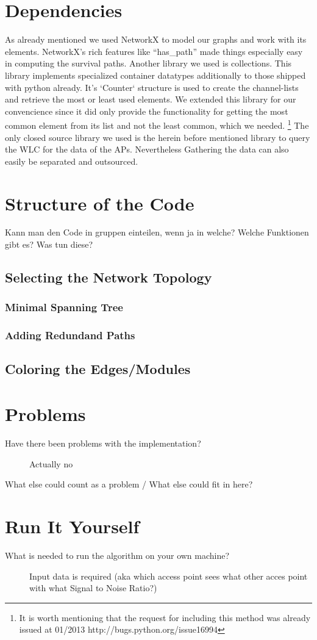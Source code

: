 \section{Dependencies}
  As already mentioned we used NetworkX\cite{hagberg-2008-exploring} to model our graphs and work with its elements.
  NetworkX's rich features like ``has\_path'' made things especially easy in computing the survival paths.
  Another library we used is collections. \cite{python_collections}
  This library implements specialized container datatypes additionally to those shipped with python already.
  It's `Counter` structure is used to create the channel-lists and retrieve the most or least used elements.
  We extended this library for our convencience since it did only provide the functionality for getting the most common element from its list and not the least common,
  which we needed. \footnote{It is worth mentioning that the request for including this method was already issued at 01/2013 http://bugs.python.org/issue16994}
  The only closed source library we used is the herein before mentioned library to query the WLC for the data of the APs. Nevertheless Gathering the data can also
  easily be separated and outsourced.
\section{Structure of the Code}
  Kann man den Code in gruppen einteilen, wenn ja in welche? Welche Funktionen gibt es? Was tun diese?
  \subsection{Selecting the Network Topology}
    \subsubsection{Minimal Spanning Tree}
    \subsubsection{Adding Redundand Paths}
  \subsection{Coloring the Edges/Modules}
\section{Problems}
  \begin{description}
   \item[Have there been problems with the implementation?]
   Actually no
   \item[What else could count as a problem / What else could fit in here?]
  \end{description}
\section{Run It Yourself}
  \begin{description}
   \item[What is needed to run the algorithm on your own machine?]
    Input data is required (aka which access point sees what other acces point with what Signal to Noise Ratio?) \newline
  \end{description}
